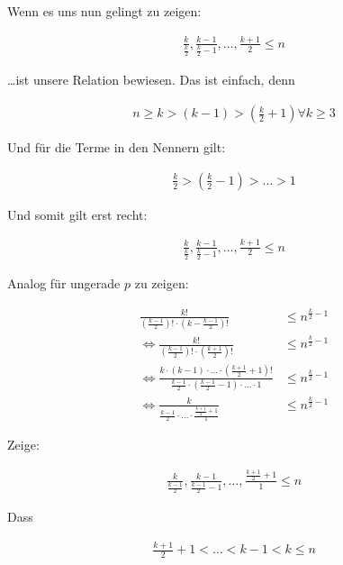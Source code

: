 \documentclass[a4paper,german,12pt,smallheadings]{scrartcl}
\begin{document}
Wenn es uns nun gelingt zu zeigen:

\begin{align*}
  \frac{k}{\frac{k}{2}}, \frac{k-1}{\frac{k}{2} - 1}, \dots, \frac{k+1}{2} \le n
\end{align*}

\dots ist unsere Relation bewiesen. Das ist einfach, denn

\begin{align*}
  n \ge k > (k-1) > \left(\frac{k}{2} + 1\right) \forall k \ge 3
\end{align*}

Und für die Terme in den Nennern gilt:

\begin{align*}
  \frac{k}{2} > \left(\frac{k}{2} - 1\right) > \dots > 1
\end{align*}

Und somit gilt erst recht:

\begin{align*}
  \frac{k}{\frac{k}{2}}, \frac{k-1}{\frac{k}{2} - 1}, \dots, \frac{k+1}{2} \le n
\end{align*}

Analog für ungerade $p$ zu zeigen:

\begin{align*}
  \frac{k!}{\left(\frac{k-1}{2}\right)! \cdot \left(k - \frac{k-1}{2}\right)!} &\le n^{\frac{k}{2} - 1} \\
  \Leftrightarrow \frac{k!}{\left(\frac{k-1}{2}\right)! \cdot \left(\frac{k+1}{2}\right)!} &\le n^{\frac{k}{2} - 1} \\
  \Leftrightarrow \frac{k \cdot (k-1) \cdot \dots \cdot \left(\frac{k+1}{2} + 1\right)!}{\frac{k-1}{2} \cdot \left(\frac{k-1}{2} -1 \right) \cdot \dots \cdot 1} &\le n^{\frac{k}{2} - 1} \\
  \Leftrightarrow \frac{k}{\frac{k-1}{2} \cdot \dots \cdot \frac{\frac{k+1}{2}+1}{1}} &\le n^{\frac{k}{2} - 1}
\end{align*}


Zeige:

\begin{align*}
  \frac{k}{\frac{k-1}{2}}, \frac{k-1}{\frac{k-1}{2} -1}, \dots, \frac{\frac{k+1}{2}+1}{1} \le n
\end{align*}

Dass

\begin{align*}
  \frac{k+1}{2} + 1 < \dots < k -1 < k \le n
\end{align*}
\end{document}
